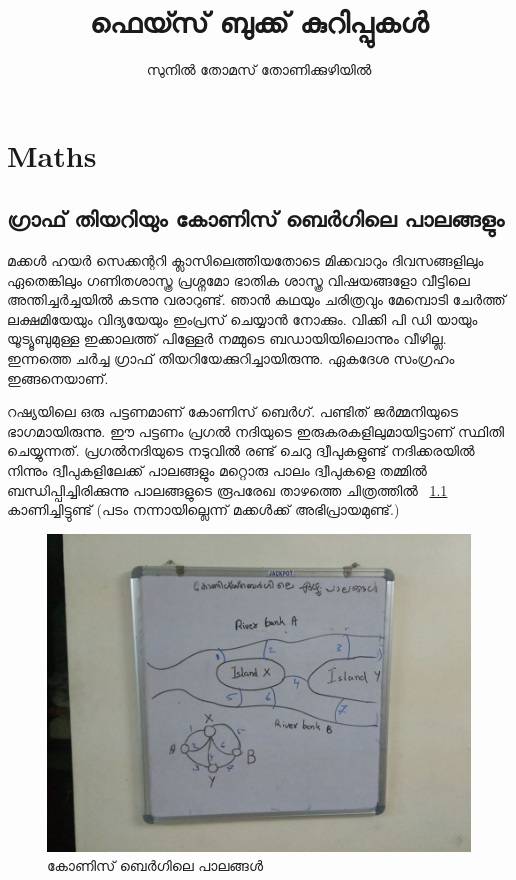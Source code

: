 \documentclass[10pt,a4paper]{report}
\author{ സുനില്‍ തോമസ് തോണിക്കുഴിയില്‍}
\title{ ഫെയ്സ് ബുക്ക് കുറിപ്പുകള്‍ }
\begin{document}
\maketitle

\chapter{Maths}
  
  
\section{ ഗ്രാഫ് തിയറിയും കോണിസ് ബെർഗിലെ പാലങ്ങളും}

മക്കൾ ഹയർ സെക്കന്ററി ക്ലാസിലെത്തിയതോടെ മിക്കവാറും ദിവസങ്ങളിലും ഏതെങ്കിലും ഗണിതശാസ്ത്ര പ്രശ്നമോ ഭാതിക ശാസ്ത്ര വിഷയങ്ങളോ വീട്ടിലെ അന്തിച്ചർച്ചയിൽ കടന്നു വരാറുണ്ട്. ഞാൻ കഥയും ചരിത്രവും മേമ്പൊടി ചേർത്ത് ലക്ഷമിയേയും വിദ്യയേയും ഇംപ്രസ് ചെയ്യാൻ നോക്കും. വിക്കി പി ഡി യായും യൂട്യൂബുമുള്ള ഇക്കാലത്ത് പിള്ളേർ നമ്മുടെ ബഡായിയിലൊന്നും വീഴില്ല. ഇന്നത്തെ ചർച്ച ഗ്രാഫ് തിയറിയേക്കുറിച്ചായിരുന്നു. ഏകദേശ സംഗ്രഹം ഇങ്ങനെയാണ്.

റഷ്യയിലെ ഒരു പട്ടണമാണ് കോണിസ് ബെർഗ്. പണ്ടിത് ജർമ്മനിയുടെ ഭാഗമായിരുന്നു. ഈ പട്ടണം പ്രഗൽ നദിയുടെ ഇരുകരകളിലുമായിട്ടാണ് സ്ഥിതി ചെയ്യുന്നത്. പ്രഗൽനദിയുടെ നടുവിൽ രണ്ട് ചെറു ദ്വീപുകളുണ്ട് നദിക്കരയിൽ നിന്നും ദ്വീപുകളിലേക്ക് പാലങ്ങളും മറ്റൊരു പാലം ദ്വീപുകളെ തമ്മിൽ ബന്ധിപ്പിച്ചിരിക്കുന്നു പാലങ്ങളുടെ രൂപരേഖ താഴത്തെ ചിത്രത്തിൽ ~\ref{palam} കാണിച്ചിട്ടുണ്ട് (പടം നന്നായില്ലെന്ന്  മക്കൾക്ക് അഭിപ്രായമുണ്ട്.)
\begin{figure}[H]
  \center
\includegraphics[scale=.25]{images/coni}
\caption{കോണിസ് ബെർഗിലെ പാലങ്ങൾ  }
\label{palam}
\end{figure}
\end{document}
